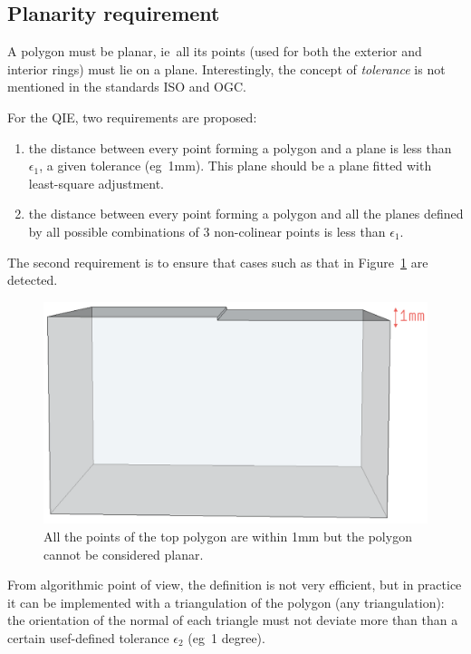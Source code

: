 \documentclass[a4paper,parskip=half,11pt]{scrartcl}
\newcommand{\ie}{ie}
\newcommand{\eg}{eg}
\begin{document}
\subsection{Planarity requirement}

A polygon must be planar, \ie\ all its points (used for both the exterior and interior rings) must lie on a plane.
Interestingly, the concept of \emph{tolerance} is not mentioned in the standards ISO and OGC\@.

For the QIE, two requirements are proposed:
\begin{enumerate}
  \item the distance between every point forming a polygon and a plane is less than $\epsilon_1$, a given tolerance (\eg\ 1mm).
  This plane should be a plane fitted with least-square adjustment.
  \item the distance between every point forming a polygon and all the planes defined by all possible combinations of 3 non-colinear points is less than $\epsilon_1$.
\end{enumerate}

The second requirement is to ensure that cases such as that in Figure~\ref{fig:planarity_fold} are detected.
\begin{figure}
  \centering
  \includegraphics[width=0.45\linewidth]{figs/planarity_fold}
  \caption{All the points of the top polygon are within 1mm but the polygon cannot be considered planar.}
\label{fig:planarity_fold}
\end{figure}
From algorithmic point of view, the definition is not very efficient, but in practice it can be implemented with a triangulation of the polygon (any triangulation): the orientation of the normal of each triangle must not deviate more than than a certain usef-defined tolerance $\epsilon_2$ (\eg\ 1 degree).


\end{document}
